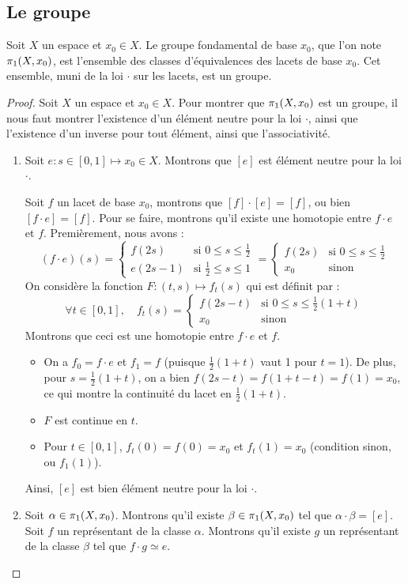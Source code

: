 \documentclass[hidelinks, 10pt]{article}
\begin{document}
\subsection{Le groupe}
\begin{theorem}
Soit $X$ un espace et $x_0\in X$. Le groupe fondamental de base $x_0$, que l'on note $\pi_1(X,x_0)$, est l'ensemble des classes d'équivalences des lacets de base $x_0$. Cet ensemble, muni de la loi $\cdot$ sur les lacets, est un groupe.
\end{theorem}

\begin{proof}
Soit $X$ un espace et $x_0\in X$. Pour montrer que $\pi_1(X,x_0)$ est un groupe, il nous faut montrer l'existence d'un élément neutre pour la loi $\cdot$, ainsi que l'existence d'un inverse pour tout élément, ainsi que l'associativité.\begin{enumerate}
    \item Soit $e:s\in[0,1]\mapsto x_0\in X$. Montrons que $[e]$ est élément neutre pour la loi $\cdot$.

    Soit $f$ un lacet de base $x_0$, montrons que $[f]\cdot[e]=[f]$, ou bien $[f\cdot e]=[f]$. Pour se faire, montrons qu'il existe une homotopie entre $f\cdot e$ et $f$. Premièrement, nous avons : \[(f\cdot e)(s)=\left\{\begin{matrix}
f(2s)&\text{si } 0\leq s\leq \frac{1}{2}\\ 
e(2s-1)&\text{si }\frac{1}{2}\leq s\leq 1
\end{matrix}\right.=\left\{\begin{matrix}
f(2s)&\text{si } 0\leq s\leq \frac{1}{2}\\ 
x_0&\text{sinon}
\end{matrix}\right.\]On considère la fonction $F:(t,s)\mapsto f_t(s)$ qui est définit par : \[\forall t\in[0,1],\quad f_t(s)=\left\{\begin{matrix}
f(2s-t)&\text{si } 0\leq s\leq \frac{1}{2}(1+t)\\ 
x_0&\text{sinon}
\end{matrix}\right.\]Montrons que ceci est une homotopie entre $f\cdot e$ et $f$.\begin{itemize}
    \item On a $f_0=f\cdot e$ et $f_1=f$ (puisque $\frac{1}{2}(1+t)$ vaut 1 pour $t=1$). De plus, pour $s=\frac{1}{2}(1+t)$, on a bien $f(2s-t)=f(1+t-t)=f(1)=x_0$, ce qui montre la continuité du lacet en $\frac{1}{2}(1+t)$.
    \item $F$ est continue en $t$.
    \item Pour $t\in[0,1]$, $f_t(0)=f(0)=x_0$ et $f_t(1)=x_0$ (condition sinon, ou $f_1(1)$).
\end{itemize}
Ainsi, $[e]$ est bien élément neutre pour la loi $\cdot$.
\item Soit $\alpha\in\pi_1(X,x_0)$. Montrons qu'il existe $\beta\in\pi_1(X,x_0)$ tel que $\alpha\cdot\beta=[e]$. Soit $f$ un représentant de la classe $\alpha$. Montrons qu'il existe $g$ un représentant de la classe $\beta$ tel que $f\cdot g\simeq e$.


\end{enumerate}
\end{proof}
\end{document}
